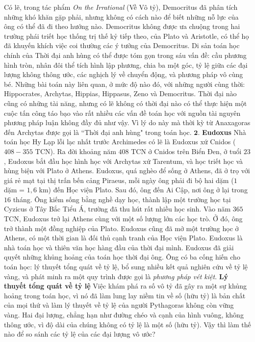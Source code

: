 \begin{multicols}{2}
	\vskip 0.1cm
	Có lẽ, trong tác phẩm \textit{On the Irrational} (Về Vô tỷ), Democritus đã phân tích những khó khăn gặp phải, nhưng không có cách nào để biết những nỗ lực của ông có thể đã đi theo hướng nào.
	\vskip 0.1cm
	Democritus không được ưa chuộng trong hai trường phái triết học thống trị thế kỷ tiếp theo, của Plato và Aristotle, có thể họ đã khuyến khích việc coi thường các ý tưởng của Democritus. 
	\vskip 0.1cm
	Di sản toán học chính của Thời đại anh hùng có thể được tóm gọn trong sáu vấn đề: cầu phương hình tròn, nhân đôi thể tích hình lập phương, chia ba một góc, tỷ lệ giữa các đại lượng không thông ước, các nghịch lý về chuyển động, và phương pháp vô cùng bé. 
	\vskip 0.1cm
	Những bài toán này liên quan, ở mức độ nào đó, với những người cùng thời: Hippocrates, Archytas, Hippias, Hippasus, Zeno và Democritus. 
	\vskip 0.1cm
	Thời đại nào cũng có những tài năng, nhưng có lẽ không có thời đại nào có thể thực hiện một cuộc tấn công táo bạo vào rất nhiều các vấn đề toán học với nguồn tài nguyên phương pháp luận không đầy đủ như vậy. Vì lý do này mà thời kỳ từ Anaxagoras đến Archytas được gọi là ``Thời đại anh hùng" trong toán học.
	\vskip 0.1cm
	$\pmb{2.}$ \textbf{\color{lichsutoanhoc}Eudoxus}
	\vskip 0.1cm
	 Nhà toán học Hy Lạp lỗi lạc nhất trước Archimedes có lẽ là Eudoxus xứ Cnidos ($408 - 355$ TCN).
	 \vskip 0.1cm
	Ra đời khoảng năm $408$ TCN ở Cnidos trên Biển Đen, ở tuổi $23$, Eudoxus bắt đầu học hình học với Archytas xứ Tarentum, và học triết học và hùng biện với Plato ở Athens. Eudoxus, quá nghèo để sống ở Athens, đã ở trọ với giá rẻ mạt tại thị trấn bến cảng Piraeus, mỗi ngày ông phải đi bộ hai dặm ($1$ dặm = $1{,}6$ km) đến Học viện Plato. Sau đó, ông đến Ai Cập, nơi ông ở lại trong $16$ tháng. Ông kiếm sống bằng nghề dạy học, thành lập một trường học tại Cyzicus ở Tây Bắc Tiểu Á, trường đã thu hút rất nhiều học sinh. Vào năm $365$ TCN, Eudoxus trở lại Athens cùng với một số lượng lớn các học trò. Ở đó, ông trở thành một đồng nghiệp của Plato.
	Eudoxus cũng đã mở một trường học ở Athens, có một thời gian là đối thủ cạnh tranh của Học viện Plato.
	\vskip 0.1cm
	Eudoxus là nhà toán học và thiên văn học hàng đầu của thời đại mình. Eudoxus đã giải quyết những khủng hoảng của toán học thời đại ông. Ông có ba cống hiến cho toán học: lý thuyết tổng quát về tỷ lệ, bổ sung nhiều kết quả nghiên cứu về tỷ lệ vàng, và phát minh ra một quy trình được gọi là \textit{phương pháp vét kiệt}.
	\vskip 0.1cm 
	\textbf{\color{lichsutoanhoc}Lý thuyết tổng quát về tỷ lệ} 
	\vskip 0.1cm
	Việc khám phá ra số vô tỷ đã gây ra một sự khủng hoảng trong toán học, vì nó đã làm lung lay niềm tin về số (hữu tỷ) là bản chất của mọi thứ và làm lý thuyết về tỷ lệ của người Pythagoras không còn vững vàng. Hai đại lượng, chẳng hạn như đường chéo và cạnh của hình vuông, không thông ước, vì độ dài của chúng không có tỷ lệ là một số (hữu tỷ). Vậy thì làm thế nào để so sánh các tỷ lệ của các đại lượng vô ước?

\end{multicols}
